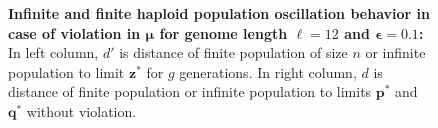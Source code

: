 \begin{figure}[h]
\begin{center}
\hspace{-3em}%
\vspace{-0.5em} \hspace{-3em}%


\caption{\textbf{Infinite and finite haploid population oscillation behavior in case of violation in $\bm{\mu}$ for genome length $\ell = 12$ and $\bm{\epsilon} = 0.1$:} 
  In left column, $d'$ is distance of finite population of size $n$ or infinite population to limit $\bm{z}^\ast$ for $g$ generations. In right column, $d$ is distance of finite population or infinite population to limits $\bm{p}^\ast$ and $\bm{q}^\ast$ without violation.}
\label{oscillation_12h_vio_mu_0.1}
\end{center}
\end{figure}

